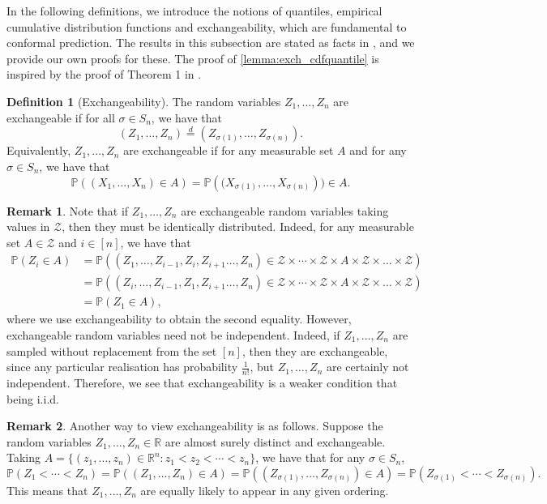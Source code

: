 \documentclass[11pt, titlepage]{article} %
\newcommand{\Prob}[1]{\mathbb{P}\left( #1 \right)}
\numberwithin{equation}{section}
\theoremstyle{definition}
\newtheorem{definition}{Definition}
\newtheorem{remark}{Remark}
\numberwithin{theorem}{section}
\numberwithin{lemma}{section}
\numberwithin{corollary}{section}
\numberwithin{proposition}{section}
\numberwithin{definition}{section}
\numberwithin{remark}{section}
\begin{document}
In the following definitions, we introduce the notions of quantiles, empirical cumulative distribution functions and exchangeability, which are fundamental to conformal prediction. The results in this subsection are stated as facts in \cite{angelopoulos2024theoreticalfoundationsconformalprediction}, and we provide our own proofs for these. The proof of \cref{lemma:exch_cdfquantile} is inspired by the proof of Theorem 1 in \cite{barber2023conformalbeyondexch}.

\begin{definition}[Exchangeability]
    The random variables \(Z_1, ..., Z_n\) are exchangeable if for all \(\sigma \in S_n\), we have that \[(Z_1, \ldots, Z_n) \overset{d}{=} (Z_{\sigma(1)}, \ldots, Z_{\sigma(n)}).\] Equivalently, \(Z_1, ..., Z_n\) are exchangeable if for any measurable set \(A\) and for any \(\sigma \in S_n\), we have that \[\Prob{(X_1, \ldots, X_n) \in A} = \Prob{(X_{\sigma(1)}, \ldots, X_{\sigma(n)}}) \in A.\]
\label{defn:exch}
\end{definition}

\begin{remark}
Note that if \(Z_1, \ldots, Z_n\) are exchangeable random variables taking values in \(\mathcal{Z}\), then they must be identically distributed. Indeed, for any measurable set \(A \in \mathcal{Z}\) and \(i \in [n]\), we have that \begin{align*} 
    \Prob{Z_i \in A} &= \Prob{(Z_1, \ldots, Z_{i-1}, Z_i, Z_{i+1} \ldots, Z_n) \in \mathcal{Z} \times \cdots \times \mathcal{Z} \times A \times \mathcal{Z} \times \ldots \times \mathcal{Z}} \\
    &= \Prob{(Z_i, \ldots, Z_{i-1}, Z_1, Z_{i+1} \ldots, Z_n) \in \mathcal{Z} \times \cdots \times \mathcal{Z} \times A \times \mathcal{Z} \times \ldots \times \mathcal{Z}} \\
    &= \Prob{Z_1 \in A},
\end{align*} where we use exchangeability to obtain the second equality. However, exchangeable random variables need not be independent. Indeed, if \(Z_1, \ldots, Z_n\) are sampled without replacement from the set \([n]\), then they are exchangeable, since any particular realisation has probability \(\frac{1}{n!}\), but \(Z_1, \ldots, Z_n\) are certainly not independent. Therefore, we see that exchangeability is a weaker condition that being i.i.d.
\label{rmk:exch_dist}
\end{remark}

\begin{remark}
    Another way to view exchangeability is as follows. Suppose the random variables \(Z_1, \ldots, Z_n \in \mathbb{R}\) are almost surely distinct and exchangeable. Taking \(A = \{(z_1, \ldots, z_n) \in \mathbb{R}^n : z_1 < z_2 < \cdots < z_n \}\), we have that for any \(\sigma \in S_n\), \[\Prob{Z_1 < \cdots < Z_n} = \Prob{(Z_1, \ldots, Z_n) \in A} = \Prob{(Z_{\sigma(1)}, \ldots, Z_{\sigma(n)}) \in A} = \Prob{Z_{\sigma(1)} < \cdots < Z_{\sigma(n)}}.\] This means that \(Z_1, \ldots, Z_n\) are equally likely to appear in any given ordering.
\label{rmk:exch_ordering}
\end{remark}
\end{document}
